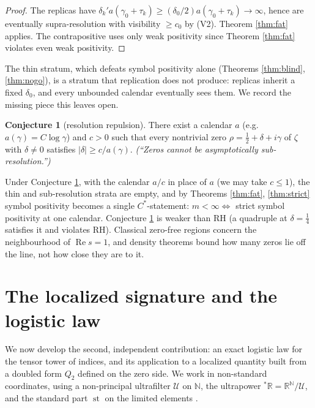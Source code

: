 \documentclass[11pt,reqno]{amsart}
\theoremstyle{definition}
\newtheorem{conjecture}[theorem]{Conjecture}
\newcommand{\R}{\mathbb{R}}
\newcommand{\N}{\mathbb{N}}
\newcommand{\sst}{\operatorname{st}}
\newcommand{\half}{\tfrac12}
\begin{document}
\begin{proof}
The replicas have
\(\delta_k'a(\gamma_0+\tau_k)\geq(\delta_0/2)a(\gamma_0+\tau_k)\to\infty\), hence
are eventually supra-resolution with visibility \(\geq c_0\) by (V2). Theorem
\ref{thm:fat} applies. The contrapositive uses only weak positivity since
Theorem \ref{thm:fat} violates even weak positivity.
\end{proof}

The thin stratum, which defeats symbol positivity alone (Theorems
\ref{thm:blind}, \ref{thm:nogo}), is a stratum that replication does
not produce: replicas inherit a fixed \(\delta_0\), and every unbounded
calendar eventually sees them. We record the missing piece this leaves open.

\begin{conjecture}[resolution repulsion]
\label{conj:lp134}
There exist a calendar \(a\) (e.g.\ \(a(\gamma)=C\log\gamma\)) and \(c>0\) such
that every nontrivial zero \(\rho=\half+\delta+i\gamma\) of \(\zeta\) with
\(\delta\neq0\) satisfies \(|\delta|\geq c/a(\gamma)\). \emph{(``Zeros cannot be
asymptotically sub-resolution.'')}
\end{conjecture}

Under Conjecture \ref{conj:lp134}, with the calendar \(a/c\) in place of \(a\)
(we may take \(c\leq1\)), the thin and sub-resolution strata are empty, and by
Theorems \ref{thm:fat}, \ref{thm:strict} symbol positivity becomes a single
\(C^*\)-statement: \(m<\infty\iff\) strict symbol positivity at one calendar.
Conjecture \ref{conj:lp134} is weaker than RH (a quadruple at
\(\delta=\tfrac14\) satisfies it and violates RH). Classical zero-free regions
concern the neighbourhood of \(\operatorname{Re}s=1\), and density theorems
bound how many zeros lie off the line, not how close they are to it.

\section{The localized signature and the logistic law}\label{sec:logistic}

We now develop the second, independent contribution: an exact logistic law for
the tensor tower of indices, and its application to a localized quantity built
from a doubled form \(Q_2\) defined on the zero side. We work in
non-standard coordinates, using a non-principal ultrafilter
\(\mathcal U\) on \(\N\), the ultrapower \({}^*\R=\R^\N/\mathcal U\), and the
standard part \(\sst\) on the limited elements \cite{Robinson}.
\end{document}
